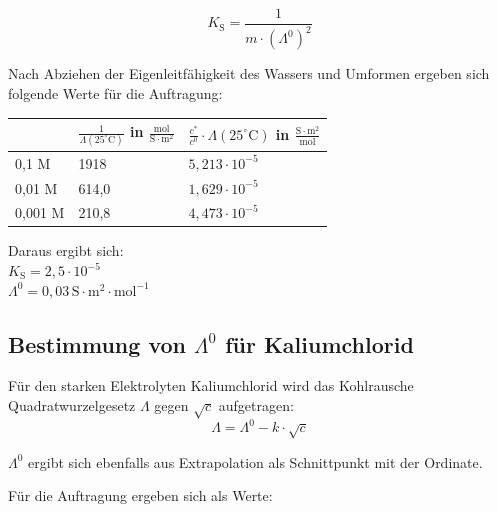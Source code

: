 \documentclass[12pt,a4paper,titlepage,headinclude,bibtotoc]{scrartcl}
\begin{document}
\begin{equation}
K_{\mathrm{S}} = \frac{1}{m \cdot (\mathit{\Lambda^0})^2}
\end{equation}

Nach Abziehen der Eigenleitfähigkeit des Wassers und Umformen ergeben sich folgende Werte für die Auftragung:\\

\begin{table} [h]
\centering 
\begin{tabular}{|p{4cm}||p{4cm}|p{4cm}|}
\hline
& $\frac{1}{\mathit{\Lambda}(25^\circ\text{C})}$ in $\frac{\mathrm{mol}}{\mathrm{S} \cdot \mathrm{m^2}}$ & $\frac{c^*}{c^0} \cdot \mathit{\Lambda}(25^\circ\text{C})$ in $\frac{\mathrm{S} \cdot \mathrm{m^2}}{\mathrm{mol}}$\\
\hline
0,1 M & 1918 & $5,213 \cdot 10^{-5}$  \\
\hline
0,01 M & 614,0 & $1,629 \cdot 10^{-5}$  \\
\hline
0,001 M & 210,8 & $4,473 \cdot 10^{-5}$ \\
\hline
\end{tabular}
\end{table}

Daraus ergibt sich:\\

$K_{\mathrm{S}} = 2,5 \cdot 10^{-5}$\\
$\mathit{\Lambda^0} = 0,03\, \mathrm{S} \cdot \mathrm{m^2} \cdot \mathrm{mol^{-1}}$\\





\subsection{Bestimmung von $\mathit{\Lambda^0}$ für Kaliumchlorid}

Für den starken Elektrolyten Kaliumchlorid wird das Kohlrausche Quadratwurzelgesetz $\mathit{\Lambda}$ gegen $\sqrt{c}$ aufgetragen:\\

\begin{equation}
\mathit{\Lambda} = \mathit{\Lambda^0} - k \cdot \sqrt{c}
\end{equation}

$\mathit{\Lambda^0}$ ergibt sich ebenfalls aus Extrapolation als Schnittpunkt mit der Ordinate.

Für die Auftragung ergeben sich als Werte:\\
\end{document}
